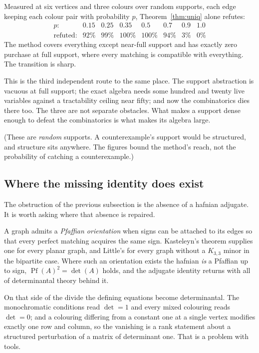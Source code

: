 \documentclass[11pt]{article}
\theoremstyle{definition}
\theoremstyle{remark}
\begin{document}
Measured at six vertices and three colours over random supports, each edge keeping
each colour pair with probability $p$, Theorem~\ref{thm:uniq} alone refutes:
\[
\begin{array}{llllllll}
p: & 0.15 & 0.25 & 0.35 & 0.5 & 0.7 & 0.9 & 1.0\\
\text{refuted}: & 92\% & 99\% & 100\% & 100\% & 94\% & 3\% & 0\%
\end{array}
\]
The method covers everything except near-full support and has exactly zero purchase
at full support, where every matching is compatible with everything. The transition
is sharp.

This is the third independent route to the same place. The support abstraction is
vacuous at full support; the exact algebra needs some hundred and twenty live
variables against a tractability ceiling near fifty; and now the combinatorics dies
there too. The three are not separate obstacles. What makes a support dense enough
to defeat the combinatorics is what makes its algebra large.

(These are \emph{random} supports. A counterexample's support would be structured,
and structure sits anywhere. The figures bound the method's reach, not the
probability of catching a counterexample.)

\subsection{Where the missing identity does exist}

The obstruction of the previous subsection is the absence of a hafnian adjugate. It
is worth asking where that absence is repaired.

A graph admits a \emph{Pfaffian orientation} when signs can be attached to its edges
so that every perfect matching acquires the same sign. Kasteleyn's theorem supplies
one for every planar graph, and Little's for every graph without a $K_{3,3}$ minor
in the bipartite case. Where such an orientation exists the hafnian \emph{is} a
Pfaffian up to sign, $\operatorname{Pf}(A)^2=\det(A)$ holds, and the adjugate
identity returns with all of determinantal theory behind it.

On that side of the divide the defining equations become determinantal. The
monochromatic conditions read $\det = 1$ and every mixed colouring reads $\det = 0$;
and a colouring differing from a constant one at a single vertex modifies exactly one
row and column, so the vanishing is a rank statement about a structured perturbation
of a matrix of determinant one. That is a problem with tools.
\end{document}
